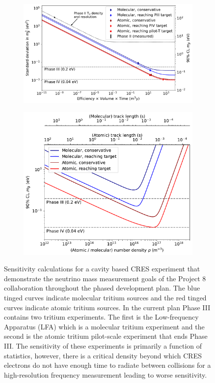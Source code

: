 \begin{figure}[htbp]
    \centering
    \begin{subfigure}{0.725\textwidth}
        \includegraphics*[width=\textwidth]{figs/Chapter-3/sensitivity_vs_exposure_curve.pdf}
    \end{subfigure}
    \begin{subfigure}{0.67\textwidth}
        \includegraphics*[width=\textwidth]{figs/Chapter-3/sensitivity_vs_density_curve.pdf}
    \end{subfigure}
    \caption{Sensitivity calculations for a cavity based CRES experiment that demonstrate the neutrino mass measurement goals of the Project 8 collaboration throughout the phased development plan. The blue tinged curves indicate molecular tritium sources and the red tinged curves indicate atomic tritium sources. In the current plan Phase III contains two tritium experiments. The first is the Low-frequency Apparatus (LFA) which is a molecular tritium experiment and the second is the atomic tritium pilot-scale experiment that ends Phase III. The sensitivity of these experiments is primarily a function of statistics, however, there is a critical density beyond which CRES electrons do not have enough time to radiate between collisions for a high-resolution frequency measurement leading to worse sensitivity. }
\end{figure}

